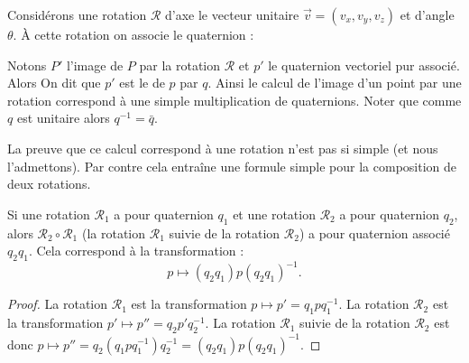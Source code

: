 \documentclass[11pt,class=report,crop=false]{standalone}
\begin{document}
Considérons une rotation $\mathcal{R}$ d'axe le vecteur unitaire 
$\vec v = (v_x,v_y,v_z)$ et d'angle $\theta$. À cette rotation on associe le quaternion :

Notons $P'$ l'image de $P$ par la rotation $\mathcal{R}$ et $p'$ le quaternion vectoriel pur associé. Alors 
On dit que $p'$ est le  de $p$ par $q$.
Ainsi le calcul de l'image d'un point par une rotation correspond à une simple multiplication de quaternions. Noter que comme $q$ est unitaire alors $q^{-1} = \bar q$.



La preuve que ce calcul correspond à une rotation n'est pas si simple (et nous l'admettons). Par contre cela entraîne une formule simple pour la composition de deux rotations.

\begin{proposition}
Si une rotation $\mathcal{R}_1$ a pour quaternion $q_1$ et une rotation $\mathcal{R}_2$ a pour quaternion $q_2$, alors $\mathcal{R}_2 \circ \mathcal{R}_1$ (la rotation $\mathcal{R}_1$ suivie de la rotation $\mathcal{R}_2$) a pour quaternion associé $q_2q_1$. Cela correspond à la transformation :
$$p \mapsto (q_2q_1) p (q_2q_1)^{-1}.$$
\end{proposition}

\begin{proof}
La rotation $\mathcal{R}_1$ est la transformation
$p \mapsto p'=q_1 p q_1^{-1}$.
La rotation $\mathcal{R}_2$ est la transformation
$p' \mapsto p''=q_2 p' q_2^{-1}$.
La rotation $\mathcal{R}_1$ suivie de la rotation $\mathcal{R}_2$ est donc $p \mapsto p'' = q_2 (q_1 p q_1^{-1}) q_2^{-1} = (q_2q_1) p (q_2q_1)^{-1}$.
\end{proof}
\end{document}
